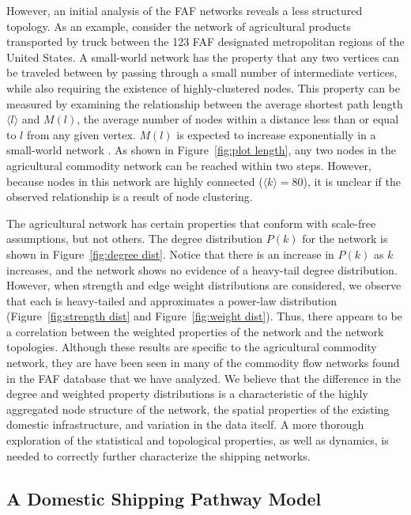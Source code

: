 \documentclass[12pt]{article}
\begin{document}
However, an initial analysis of the FAF networks reveals a less structured topology.  As an example, consider the network of agricultural products transported by truck between the 123 FAF designated metropolitan regions of the United States.  A small-world network has the property that any two vertices can be traveled between by passing through a small number of intermediate vertices, while also requiring the existence of highly-clustered nodes.  This property can be measured by examining the relationship between the average shortest path length $\big \langle l \big \rangle$ and $M(l)$, the average number of nodes within a distance less than or equal to $l$ from any given vertex.  $M(l)$ is expected to increase exponentially in a small-world network \citep{Barrat2008}.  As shown in Figure~\ref{fig:plot length}, any two nodes in the agricultural commodity network can be reached within two steps.  However, because nodes in this network are highly connected ($\big \langle k \big \rangle = 80$), it is unclear if the observed relationship is a result of node clustering.  

The agricultural network has certain properties that conform with scale-free assumptions, but not others.  The degree distribution $P(k)$ for the network is shown in Figure~\ref{fig:degree dist}.  Notice that there is an increase in $P(k)$ as $k$ increases, and the network shows no evidence of a heavy-tail degree distribution.  However, when strength and edge weight distributions are considered, we observe that each is heavy-tailed and approximates a power-law distribution (Figure~\ref{fig:strength dist} and Figure~\ref{fig:weight dist}).  Thus, there appears to be a correlation between the weighted properties of the network and the network topologies.  Although these results are specific to the agricultural commodity network, they are have been seen in many of the commodity flow networks found in the FAF database that we have analyzed.  We believe that the difference in the degree and weighted property distributions is a characteristic of the highly aggregated node structure of the network, the spatial properties of the existing domestic infrastructure, and variation in the data itself. A more thorough exploration of the statistical and topological properties, as well as dynamics, is needed to correctly further characterize the shipping networks.

\subsection*{A Domestic Shipping Pathway Model}
\end{document}
